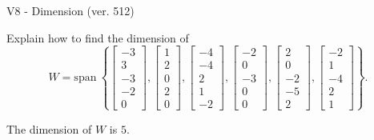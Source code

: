 \begin{exercise}
  \begin{exerciseTitle}V8 - Dimension (ver. 512)\end{exerciseTitle}
  \begin{exerciseStatement}
    Explain how to find the dimension of 
\[W=\mathrm{span}\ \left\{\left[\begin{array}{r}
-3 \\
3 \\
-3 \\
-2 \\
0
\end{array}\right] , \left[\begin{array}{r}
1 \\
2 \\
0 \\
2 \\
0
\end{array}\right] , \left[\begin{array}{r}
-4 \\
-4 \\
2 \\
1 \\
-2
\end{array}\right] , \left[\begin{array}{r}
-2 \\
0 \\
-3 \\
0 \\
0
\end{array}\right] , \left[\begin{array}{r}
2 \\
0 \\
-2 \\
-5 \\
2
\end{array}\right] , \left[\begin{array}{r}
-2 \\
1 \\
-4 \\
2 \\
1
\end{array}\right]\right\}.\]



  \end{exerciseStatement}
  \begin{exerciseAnswer}
   The dimension of \(W\) is  \(5\).
  


  \end{exerciseAnswer}
\end{exercise}